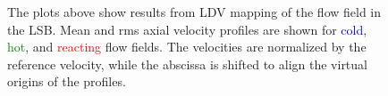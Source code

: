 \begin{figure}

\centering



\caption[Effect of temperature on the LSB flow field - I]{The plots above show results from LDV mapping of the flow field in the LSB. Mean and rms axial velocity profiles are shown for \textcolor{blue}{cold}, \textcolor{green}{hot}, and \textcolor{red}{reacting} flow fields. The velocities are normalized by the reference velocity, while the abscissa is shifted to align the virtual origins of the profiles.}

\label{fig:temperatureLDVResults}

\end{figure}


